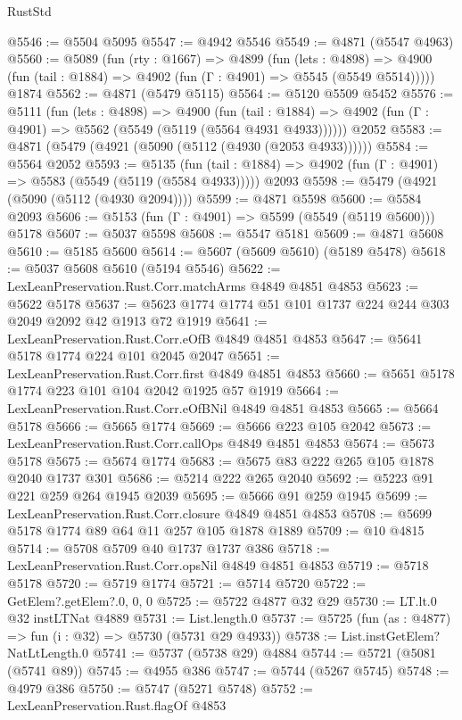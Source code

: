 \begin{lexlean}{RustStd}
\begin{coremodule}
@5546 := @5504 @5095
@5547 := @4942 @5546
@5549 := @4871 (@5547 @4963)
@5560 := @5089
    (fun (rty : @1667) =>
    @4899
      (fun (lets : @4898) =>
      @4900 (fun (tail : @1884) => @4902 (fun (Γ : @4901) => @5545 (@5549 @5514)))))
    @1874
@5562 := @4871 (@5479 @5115)
@5564 := @5120 @5509 @5452
@5576 := @5111
    (fun (lets : @4898) =>
    @4900
      (fun (tail : @1884) => @4902 (fun (Γ : @4901) => @5562 (@5549 (@5119 (@5564 @4931 @4933))))))
    @2052
@5583 := @4871 (@5479 (@4921 (@5090 (@5112 (@4930 (@2053 @4933))))))
@5584 := @5564 @2052
@5593 := @5135
    (fun (tail : @1884) => @4902 (fun (Γ : @4901) => @5583 (@5549 (@5119 (@5584 @4933)))))
    @2093
@5598 := @5479 (@4921 (@5090 (@5112 (@4930 @2094))))
@5599 := @4871 @5598
@5600 := @5584 @2093
@5606 := @5153 (fun (Γ : @4901) => @5599 (@5549 (@5119 @5600))) @5178
@5607 := @5037 @5598
@5608 := @5547 @5181
@5609 := @4871 @5608
@5610 := @5185 @5600
@5614 := @5607 (@5609 @5610) (@5189 @5478)
@5618 := @5037 @5608 @5610 (@5194 @5546)
@5622 := LexLeanPreservation.Rust.Corr.matchArms @4849 @4851 @4853
@5623 := @5622 @5178
@5637 := @5623 @1774 @1774 @51 @101 @1737 @224 @244 @303 @2049 @2092 @42 @1913 @72 @1919
@5641 := LexLeanPreservation.Rust.Corr.eOfB @4849 @4851 @4853
@5647 := @5641 @5178 @1774 @224 @101 @2045 @2047
@5651 := LexLeanPreservation.Rust.Corr.first @4849 @4851 @4853
@5660 := @5651 @5178 @1774 @223 @101 @104 @2042 @1925 @57 @1919
@5664 := LexLeanPreservation.Rust.Corr.eOfBNil @4849 @4851 @4853
@5665 := @5664 @5178
@5666 := @5665 @1774
@5669 := @5666 @223 @105 @2042
@5673 := LexLeanPreservation.Rust.Corr.callOps @4849 @4851 @4853
@5674 := @5673 @5178
@5675 := @5674 @1774
@5683 := @5675 @83 @222 @265 @105 @1878 @2040 @1737 @301
@5686 := @5214 @222 @265 @2040
@5692 := @5223 @91 @221 @259 @264 @1945 @2039
@5695 := @5666 @91 @259 @1945
@5699 := LexLeanPreservation.Rust.Corr.closure @4849 @4851 @4853
@5708 := @5699 @5178 @1774 @89 @64 @11 @257 @105 @1878 @1889
@5709 := @10 @4815
@5714 := @5708 @5709 @40 @1737 @1737 @386
@5718 := LexLeanPreservation.Rust.Corr.opsNil @4849 @4851 @4853
@5719 := @5718 @5178
@5720 := @5719 @1774
@5721 := @5714 @5720
@5722 := GetElem?.getElem?.{0, 0, 0}
@5725 := @5722 @4877 @32 @29
@5730 := LT.lt.{0} @32 instLTNat @4889
@5731 := List.length.{0}
@5737 := @5725 (fun (as : @4877) => fun (i : @32) => @5730 (@5731 @29 @4933))
@5738 := List.instGetElem?NatLtLength.{0}
@5741 := @5737 (@5738 @29) @4884
@5744 := @5721 (@5081 (@5741 @89))
@5745 := @4955 @386
@5747 := @5744 (@5267 @5745)
@5748 := @4979 @386
@5750 := @5747 (@5271 @5748)
@5752 := LexLeanPreservation.Rust.flagOf @4853

\end{coremodule}
\end{lexlean}
